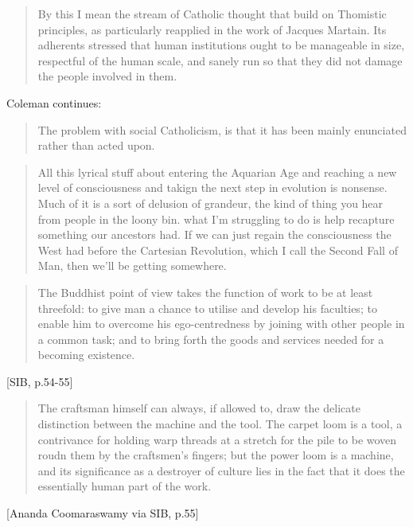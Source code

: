 \begin{quote}
By this I mean the stream of Catholic thought that build on Thomistic principles, as particularly reapplied in the work of Jacques Martain. Its adherents stressed that human institutions ought to be manageable in size, respectful of the human scale, and sanely run so that they did not damage the people involved in them.
\end{quote}


Coleman continues:

\begin{quote}
The problem with social Catholicism, is that it has been mainly enunciated rather than acted upon.
\end{quote}

\begin{quote}
	All this lyrical stuff about entering the Aquarian Age and reaching a new level of consciousness and takign the next step in evolution is nonsense. Much of it is a sort of delusion of grandeur, the kind of thing you hear from people in the loony bin. what I'm struggling to do is help recapture something our ancestors had. If we can just regain the consciousness the West had before the Cartesian Revolution, which I call the Second Fall of Man, then we'll be getting somewhere.

\end{quote}




\begin{quote}
The Buddhist point of view takes the function of work to be at least threefold: to give man a chance to utilise and develop his faculties; to enable him to overcome his ego-centredness by joining with other people in a common task; and to bring forth the goods and services needed for a becoming existence.
\end{quote} [SIB, p.54-55]

\begin{quote}
The craftsman himself can always, if allowed to, draw the delicate distinction between the machine and the tool. The carpet loom is a tool, a contrivance for holding warp threads at a stretch for the pile to be woven roudn them by the craftsmen's fingers; but the power loom is a machine, and its significance as a destroyer of culture lies in the fact that it does the essentially human part of the work.
\end{quote} [Ananda Coomaraswamy via SIB, p.55]


